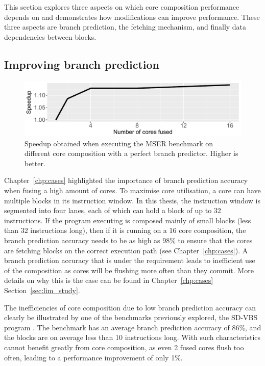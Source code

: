 This section explores three aspects on which core composition performance depends on and demonstrates how modifications can improve performance.
These three aspects are branch prediction, the fetching mechanism, and finally data dependencies between blocks.

\subsection{Improving branch prediction}

\begin{figure}[t]
    \centering
    \includegraphics[width=1\textwidth]{chapter3/graphics/motiv_branch_mser.pdf}
    \caption{Speedup obtained when executing the MSER benchmark on different core composition with a perfect branch predictor. Higher is better.}
    \label{fig:mser_motiv}
	\vspace{1em}
\end{figure}
Chapter~\ref{chp:cases} highlighted the importance of branch prediction accuracy when fusing a high amount of cores.
To maximise core utilisation, a core can have multiple blocks in its instruction window.
In this thesis, the instruction window is segmented into four lanes, each of which can hold a block of up to 32 instructions.
If the program executing is composed mainly of small blocks (less than 32 instructions long), then if it is running on a 16 core composition, the branch prediction accuracy needs to be as high as 98\% to ensure that the cores are fetching blocks on the correct execution path (see Chapter~\ref{chp:cases}).
A branch prediction accuracy that is under the requirement leads to inefficient use of the composition as cores will be flushing more often than they commit.
More details on why this is the case can be found in Chapter~\ref{chp:cases} Section~\ref{sec:lim_study}.

The inefficiencies of core composition due to low branch prediction accuracy can clearly be illustrated by one of the benchmarks previously explored, the SD-VBS program .
The benchmark has an average branch prediction accuracy of 86\%, and the blocks are on average less than 10 instructions long.
With such characteristics  cannot benefit greatly from core composition, as even 2 fused cores flush too often, leading to a performance improvement of only 1\%.

